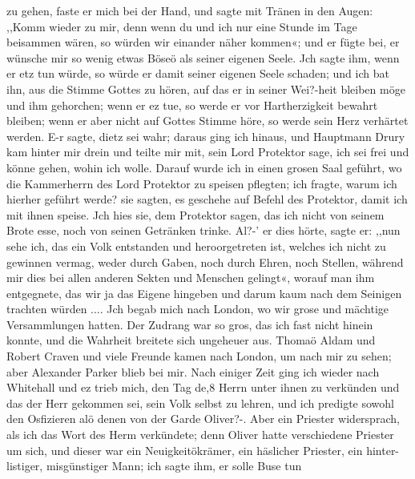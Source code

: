 zu gehen, faste er mich bei der Hand, und sagte mit Tränen in
den Augen: ,,Komm wieder zu mir, denn wenn du und ich nur
eine Stunde im Tage beisammen wären, so würden wir einander
näher kommen«; und er fügte bei, er wünsche mir so wenig etwas
Böseö als seiner eigenen Seele. Jch sagte ihm, wenn er etz tun
würde, so würde er damit seiner eigenen Seele schaden; und ich
bat ihn, aus die Stimme Gottes zu hören, auf das er in seiner
Wei?-heit bleiben möge und ihm gehorchen; wenn er ez tue, so
werde er vor Hartherzigkeit bewahrt bleiben; wenn er aber
nicht auf Gottes Stimme höre, so werde sein Herz verhärtet
werden. E-r sagte, dietz sei wahr; daraus ging ich hinaus, und
Hauptmann Drury kam hinter mir drein und teilte mir mit, sein
Lord Protektor sage, ich sei frei und könne gehen, wohin ich
wolle. Darauf wurde ich in einen grosen Saal geführt, wo
die Kammerherrn des Lord Protektor zu speisen pflegten; ich fragte,
warum ich hierher geführt werde? sie sagten, es geschehe auf
Befehl des Protektor, damit ich mit ihnen speise. Jch hies sie,
dem Protektor sagen, das ich nicht von seinem Brote esse, noch
von seinen Getränken trinke. Al?-’ er dies hörte, sagte er: ,,nun
sehe ich, das ein Volk entstanden und heroorgetreten ist, welches
ich nicht zu gewinnen vermag, weder durch Gaben, noch durch
Ehren, noch Stellen, während mir dies bei allen anderen Sekten
und Menschen gelingt«, worauf man ihm entgegnete, das wir
ja das Eigene hingeben und darum kaum nach dem Seinigen
trachten würden ....
Jch begab mich nach London, wo wir grose und mächtige
Versammlungen hatten. Der Zudrang war so gros, das ich fast
nicht hinein konnte, und die Wahrheit breitete sich ungeheuer aus.
Thomaö Aldam und Robert Craven und viele Freunde kamen
nach London, um nach mir zu sehen; aber Alexander Parker
blieb bei mir.
Nach einiger Zeit ging ich wieder nach Whitehall und ez
trieb mich, den Tag de,8 Herrn unter ihnen zu verkünden und
das der Herr gekommen sei, sein Volk selbst zu lehren, und ich
predigte sowohl den Osfizieren alö denen von der Garde Oliver?-.
Aber ein Priester widersprach, als ich das Wort des Herm
verkündete; denn Oliver hatte verschiedene Priester um sich, und
dieser war ein Neuigkeitökrämer, ein häslicher Priester, ein hinter-
listiger, misgünstiger Mann; ich sagte ihm, er solle Buse tun


